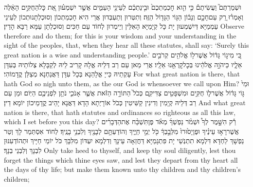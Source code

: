 {וּשְׁמַרְתֶּם֮ וַעֲשִׂיתֶם֒ כִּ֣י הִ֤וא חׇכְמַתְכֶם֙ וּבִ֣ינַתְכֶ֔ם לְעֵינֵ֖י הָעַמִּ֑ים אֲשֶׁ֣ר יִשְׁמְע֗וּן אֵ֚ת כׇּל\maqqaf הַחֻקִּ֣ים הָאֵ֔לֶּה וְאָמְר֗וּ רַ֚ק עַם\maqqaf חָכָ֣ם וְנָב֔וֹן הַגּ֥וֹי הַגָּד֖וֹל הַזֶּֽה׃}
{וְתִטְּרוּן וְתַעְבְּדוּן אֲרֵי הִיא חָכְמַתְכוֹן וְסוּכְלְתָנוּתְכוֹן לְעֵינֵי עַמְמַיָּא דְּיִשְׁמְעוּן יָת כָּל קְיָמַיָּא הָאִלֵּין וְיֵימְרוּן לְחוֹד עַם חַכִּים וְסוּכְלְתָן עַמָּא רַבָּא הָדֵין׃}
{Observe therefore and do them; for this is your wisdom and your understanding in the sight of the peoples, that, when they hear all these statutes, shall say: ‘Surely this great nation is a wise and understanding people.’}{}
{כִּ֚י מִי\maqqaf ג֣וֹי גָּד֔וֹל אֲשֶׁר\maqqaf ל֥וֹ אֱלֹהִ֖ים קְרֹבִ֣ים אֵלָ֑יו כַּיהֹוָ֣ה אֱלֹהֵ֔ינוּ בְּכׇל\maqqaf קׇרְאֵ֖נוּ אֵלָֽיו׃}
{אֲרֵי מַאן עַם רַב דְּלֵיהּ אֱלָהּ קָרִיב לֵיהּ לְקַבָּלָא צְלוֹתֵיהּ בְּעִדָּן עָקְתֵיהּ כַּייָ אֱלָהַנָא בְּכָל עִדָּן דַּאֲנַחְנָא מְצַלַּן קֳדָמוֹהִי׃}
{For what great nation is there, that hath God so nigh unto them, as the \lord\space our God is whensoever we call upon Him?}{}
{וּמִי֙ גּ֣וֹי גָּד֔וֹל אֲשֶׁר\maqqaf ל֛וֹ חֻקִּ֥ים וּמִשְׁפָּטִ֖ים צַדִּיקִ֑ם כְּכֹל֙ הַתּוֹרָ֣ה הַזֹּ֔את אֲשֶׁ֧ר אָנֹכִ֛י נֹתֵ֥ן לִפְנֵיכֶ֖ם הַיּֽוֹם׃}
{וּמַן עַם רַב דְּלֵיהּ קְיָמִין וְדִינִין קַשִּׁיטִין כְּכֹל אוֹרָיְתָא הָדָא דַּאֲנָא יָהֵיב קֳדָמֵיכוֹן יוֹמָא דֵין׃}
{And what great nation is there, that hath statutes and ordinances so righteous as all this law, which I set before you this day?}{}
{רַ֡ק הִשָּׁ֣מֶר לְךָ֩ וּשְׁמֹ֨ר נַפְשְׁךָ֜ מְאֹ֗ד פֶּן\maqqaf תִּשְׁכַּ֨ח אֶת\maqqaf הַדְּבָרִ֜ים אֲשֶׁר\maqqaf רָא֣וּ עֵינֶ֗יךָ וּפֶן\maqqaf יָס֙וּרוּ֙ מִלְּבָ֣בְךָ֔ כֹּ֖ל יְמֵ֣י חַיֶּ֑יךָ וְהוֹדַעְתָּ֥ם לְבָנֶ֖יךָ וְלִבְנֵ֥י בָנֶֽיךָ׃}
{לְחוֹד אִסְתְּמַר לָךְ וְטַר נַפְשָׁךְ לַחְדָּא דִּלְמָא תִתְנְשֵׁי יָת פִּתְגָמַיָּא דַּחֲזַאָה עֵינָךְ וְדִלְמָא יִעְדּוֹן מִלִּבָּךְ כֹּל יוֹמֵי חַיָּיךְ וּתְהוֹדְעִנּוּן לִבְנָךְ וְלִבְנֵי בְנָךְ׃}
{Only take heed to thyself, and keep thy soul diligently, lest thou forget the things which thine eyes saw, and lest they depart from thy heart all the days of thy life; but make them known unto thy children and thy children’s children;}{}
